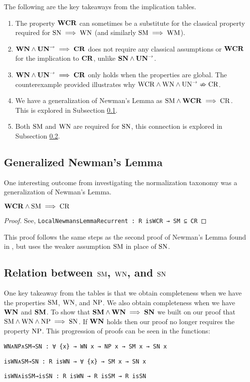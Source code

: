 \begin{remark} The following are the key takeaways from the implication tables. \hfill
    \begin{enumerate}
        \item The property $\mathbf{WCR}$ can sometimes be a substitute for the classical
        property required for $\mathrm{SN} \implies \mathrm{WN}$ (and similarly $\mathrm{SM} \implies \mathrm{WM}$).
        \item $\mathbf{WN} \land \mathbf{UN}^{\to} \implies \mathbf{CR}$ does not require any classical assumptions
         or $\mathbf{WCR}$ for the implication to $\mathbf{CR}$, unlike $\mathbf{SN} \land \mathbf{UN}^{\to}$.
        \item $\mathbf{WN} \land \mathbf{UN}^{\to} \implies \mathbf{CR}$ only holds when the properties are global. The
        counterexample provided illustrates why $\mathrm{WCR} \land \mathrm{WN} \land \mathrm{UN}^{\to} \nRightarrow \mathrm{CR}$.
        \item We have a generalization of Newman's Lemma as $\mathrm{SM} \land \mathbf{WCR} \implies \mathrm{CR}$. This is explored in Subsection \ref{subsec:newnewman}.
        \item Both $\mathrm{SM}$ and $\mathrm{WN}$ are required for $\mathrm{SN}$, this connection is explored in Subsection \ref{subsec:SMWNSN}.
    \end{enumerate}
\end{remark}

\subsection{Generalized Newman's Lemma}\label{subsec:newnewman}
One interesting outcome from investigating the normalization taxonomy was a generalization of Newman's Lemma.

\begin{proposition}
    $\mathbf{WCR} \land \mathrm{SM} \implies \mathrm{CR}$
\end{proposition}
\begin{proof}
    See, \verb|LocalNewmansLemmaRecurrent : R isWCR → SM ⊆ CR|
\end{proof}

This proof follows the same steps as the second proof of Newman's Lemma found in \terese, but
uses the weaker assumption $\mathrm{SM}$ in place of $\mathrm{SN}$.

\subsection{Relation between $\mathrm{SM}$, $\mathrm{WN}$, and $\mathrm{SN}$} \label{subsec:SMWNSN}
One key takeaway from the tables is that we obtain completeness when we have the properties $\mathrm{SM}$, $\mathrm{WN}$, and $\mathrm{NP}$. We also
obtain completeness when we have $\mathbf{WN}$ and $\mathbf{SM}$.
To show that $\mathbf{SM} \land \mathbf{WN} \implies \mathbf{SN}$ we built on our proof that $\mathrm{SM} \land \mathrm{WN} \land \mathrm{NP} \implies \mathrm{SN}$. If $\mathbf{WN}$ holds
then our proof no longer requires the property $\mathrm{NP}$. This progression of proofs can be seen in the functions:

\verb|WN∧NP∧SM→SN : ∀ {x} → WN x → NP x → SM x → SN x|

\verb|isWN∧SM→SN : R isWN → ∀ {x} → SM x → SN x|

\verb|isWN∧isSM→isSN : R isWN → R isSM → R isSN|
